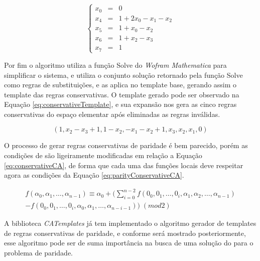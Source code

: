 	\begin{equation}
	\left\{\begin{matrix}
	 x_0 & = & 0\\ 
	 x_4 & = & 1 +2x_0 -x_1 -x_2\\ 
	 x_5 & = & 1 +x_0 -x_2\\
	 x_6 & = & 1 +x_2 -x_3\\ 
	 x_7 & = & 1
	\end{matrix}\right.
	\label{eq:conservativeLinearSystem3}
	\end{equation}

	Por fim o algoritmo utiliza a função Solve do \textit{Wofram Mathematica} para simplificar o sistema, e utiliza o conjunto solução retornado pela função Solve como regras de substituições, e as aplica no template base, gerando assim o template das regras conservativas. O template gerado pode ser observado na Equação \ref{eq:conservativeTemplate}, e sua expansão nos gera as cinco regras conservativas do espaço elementar após eliminadas as regras inválidas.

	\begin{equation}
	(1,x_2-x_3+1,1-x_2,-x_1-x_2+1,x_3,x_2,x_1,0)
	\label{eq:conservativeTemplate}
	\end{equation}

	O processo de gerar regras conservativas de paridade é bem parecido, porém as condições de  são ligeiramente modificadas em relação a Equação \ref{eq:conservativeCA}, de forma que cada uma das funções locais deve respeitar agora as condições da Equação \ref{eq:parityConservativeCA}.

	\begin{equation}
	\begin{split}
	f(\alpha_0,\alpha_1, \dots,\alpha_{n-1}) \equiv \alpha_0 + (\sum_{i=0}^{n-2}f(0_0,0_1, \dots,0_i,\alpha_1,\alpha_2, \dots,\alpha_{n-1}) \\- f(0_0,0_1, \dots,0_i,\alpha_0,\alpha_1, \dots,\alpha_{n-i-1})) \; (mod 2)  
	\label{eq:parityConservativeCA}
	\end{split}
	\end{equation}

	A biblioteca \textit{CATemplates} já tem implementado o algoritmo gerador de templates de regras conservativas de paridade, e conforme será mostrado posteriormente, esse algoritmo pode ser de suma importância na busca de uma solução do para o problema de paridade.





